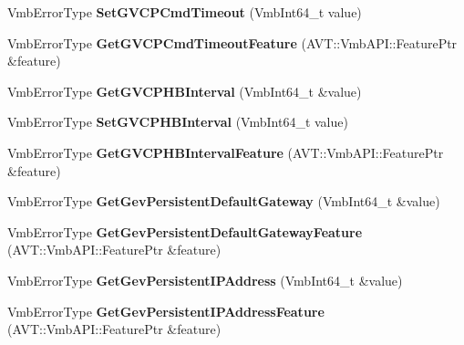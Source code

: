 \begin{DoxyCompactItemize}
\item 
\hypertarget{classMakoCamera_ac3a935476acbd74cb6dbe865e0929fa5}{Vmb\-Error\-Type {\bfseries Set\-G\-V\-C\-P\-Cmd\-Timeout} (Vmb\-Int64\-\_\-t value)}\label{classMakoCamera_ac3a935476acbd74cb6dbe865e0929fa5}

\item 
\hypertarget{classMakoCamera_ab1e85b4a16de14a8635f2bb88373788e}{Vmb\-Error\-Type {\bfseries Get\-G\-V\-C\-P\-Cmd\-Timeout\-Feature} (A\-V\-T\-::\-Vmb\-A\-P\-I\-::\-Feature\-Ptr \&feature)}\label{classMakoCamera_ab1e85b4a16de14a8635f2bb88373788e}

\item 
\hypertarget{classMakoCamera_a10b28b4a71bc08014ad824384273cc40}{Vmb\-Error\-Type {\bfseries Get\-G\-V\-C\-P\-H\-B\-Interval} (Vmb\-Int64\-\_\-t \&value)}\label{classMakoCamera_a10b28b4a71bc08014ad824384273cc40}

\item 
\hypertarget{classMakoCamera_aa7010531060d2e0b4535cd4b7472c448}{Vmb\-Error\-Type {\bfseries Set\-G\-V\-C\-P\-H\-B\-Interval} (Vmb\-Int64\-\_\-t value)}\label{classMakoCamera_aa7010531060d2e0b4535cd4b7472c448}

\item 
\hypertarget{classMakoCamera_a90f4e276e6ca0b204e71b9879864018b}{Vmb\-Error\-Type {\bfseries Get\-G\-V\-C\-P\-H\-B\-Interval\-Feature} (A\-V\-T\-::\-Vmb\-A\-P\-I\-::\-Feature\-Ptr \&feature)}\label{classMakoCamera_a90f4e276e6ca0b204e71b9879864018b}

\item 
\hypertarget{classMakoCamera_a6a6fd32aad4f2401c3aa228417c2b696}{Vmb\-Error\-Type {\bfseries Get\-Gev\-Persistent\-Default\-Gateway} (Vmb\-Int64\-\_\-t \&value)}\label{classMakoCamera_a6a6fd32aad4f2401c3aa228417c2b696}

\item 
\hypertarget{classMakoCamera_ab821ec0abad698cce555ae38445bd49a}{Vmb\-Error\-Type {\bfseries Get\-Gev\-Persistent\-Default\-Gateway\-Feature} (A\-V\-T\-::\-Vmb\-A\-P\-I\-::\-Feature\-Ptr \&feature)}\label{classMakoCamera_ab821ec0abad698cce555ae38445bd49a}

\item 
\hypertarget{classMakoCamera_ae4da71d1a0c73c3fd8dd8619c51de1ed}{Vmb\-Error\-Type {\bfseries Get\-Gev\-Persistent\-I\-P\-Address} (Vmb\-Int64\-\_\-t \&value)}\label{classMakoCamera_ae4da71d1a0c73c3fd8dd8619c51de1ed}

\item 
\hypertarget{classMakoCamera_af07ddc326dd11eb2da22ca3eb2a1bd32}{Vmb\-Error\-Type {\bfseries Get\-Gev\-Persistent\-I\-P\-Address\-Feature} (A\-V\-T\-::\-Vmb\-A\-P\-I\-::\-Feature\-Ptr \&feature)}\label{classMakoCamera_af07ddc326dd11eb2da22ca3eb2a1bd32}


\end{DoxyCompactItemize}
